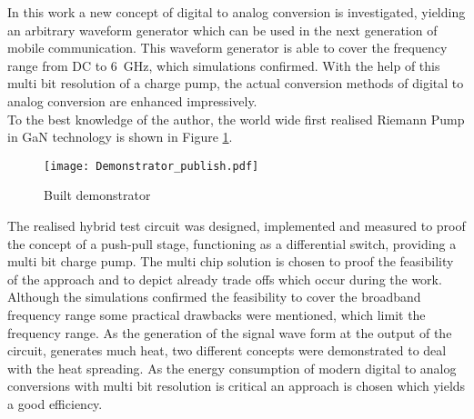 In this work a new concept of digital to analog conversion is investigated, yielding an arbitrary waveform generator which can be used in the next generation of mobile communication.
This waveform generator is able to cover the frequency range from DC to \SI{6}{\giga \hertz}, which simulations confirmed.
With the help of this multi bit resolution of a charge pump, the actual conversion methods of digital to analog conversion are enhanced impressively.
\\
To the best knowledge of the author, the world wide first realised Riemann Pump in GaN technology is shown in Figure \ref{fig:Demonstrator}.

\begin{figure}[h]
	\centering
  \texttt{[image: Demonstrator\_publish.pdf]}
	\caption{Built demonstrator}
	\label{fig:Demonstrator}
\end{figure}

\newpage

The realised hybrid test circuit was designed, implemented and measured to proof the concept of a push-pull stage, functioning as a differential switch, providing a multi bit charge pump.
The multi chip solution is chosen to proof the feasibility of the approach and to depict already trade offs which occur during the work.\\
Although the simulations confirmed the feasibility to cover the broadband frequency range some practical drawbacks were mentioned, which limit the frequency range.
As the generation of the signal wave form at the output of the circuit, generates much heat, two different concepts were demonstrated to deal with the heat spreading.
As the energy consumption of modern digital to analog conversions with multi bit resolution is critical an approach is chosen which yields a good efficiency.



